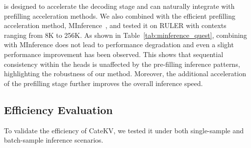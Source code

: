 \shortname is designed to accelerate the decoding stage and can naturally integrate with prefilling acceleration methods.
We also combined \shortname with the efficient prefilling acceleration method, MInference~\cite{minference}, and tested it on RULER with contexts ranging from 8K to 256K.
As shown in Table~\ref{tab:minference_quest}, combining \shortname with MInference does not lead to performance degradation and even a slight performance improvement has been observed.
This shows that sequential consistency within the heads is unaffected by the pre-filling inference patterns, highlighting the robustness of our method.
Moreover, the additional acceleration of the prefilling stage further improves the overall inference speed.



\subsection{Efficiency Evaluation}


To validate the efficiency of CateKV, we tested it under both single-sample and batch-sample inference scenarios.

